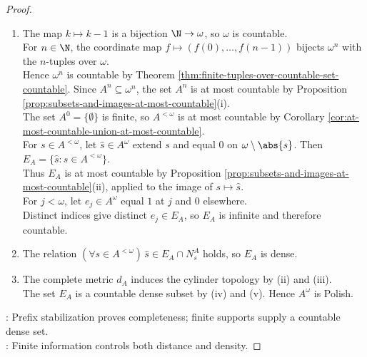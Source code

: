 \begin{theorem}
\begin{proof}
\begin{enumerate}[label=(\roman*)]
Both sides require agreement below $m$, so each cylinder containing $x$ is a metric ball.\\
Conversely, given $\varepsilon>0$, choose $m<\omega$ with $2^{-m}<\varepsilon$.\\
Then $N_{x|_m}^A\subseteq\{y\in A^\omega:d_A(x,y)<\varepsilon\}$, so the metric and cylinder topologies coincide.
\item The map $k\mapsto k-1$ is a bijection $\N\to\omega$, so $\omega$ is countable.\\
For $n\in\N$, the coordinate map $f\mapsto(f(0),\ldots,f(n-1))$ bijects $\omega^n$ with the $n$-tuples over $\omega$.\\
Hence $\omega^n$ is countable by Theorem \ref{thm:finite-tuples-over-countable-set-countable}. Since $A^n\subseteq\omega^n$, the set $A^n$ is at most countable by Proposition \ref{prop:subsets-and-images-at-most-countable}(i).\\
The set $A^0=\{\emptyset\}$ is finite, so $A^{<\omega}$ is at most countable by Corollary \ref{cor:at-most-countable-union-at-most-countable}.\\
For $s\in A^{<\omega}$, let $\widehat{s}\in A^\omega$ extend $s$ and equal $0$ on $\omega\setminus\abs{s}$. Then $E_A=\{\widehat{s}:s\in A^{<\omega}\}$.\\
Thus $E_A$ is at most countable by Proposition \ref{prop:subsets-and-images-at-most-countable}(ii), applied to the image of $s\mapsto\widehat{s}$.\\
For $j<\omega$, let $e_j\in A^\omega$ equal $1$ at $j$ and $0$ elsewhere.\\
Distinct indices give distinct $e_j\in E_A$, so $E_A$ is infinite and therefore countable.
\item The relation $(\forall s\in A^{<\omega})\,\widehat{s}\in E_A\cap N_s^A$ holds, so $E_A$ is dense.
\item The complete metric $d_A$ induces the cylinder topology by (ii) and (iii).\\
The set $E_A$ is a countable dense subset by (iv) and (v). Hence $A^\omega$ is Polish.
\end{enumerate}
: Prefix stabilization proves completeness; finite supports supply a countable dense set.\\
: Finite information controls both distance and density.
\end{proof}
\end{theorem}

